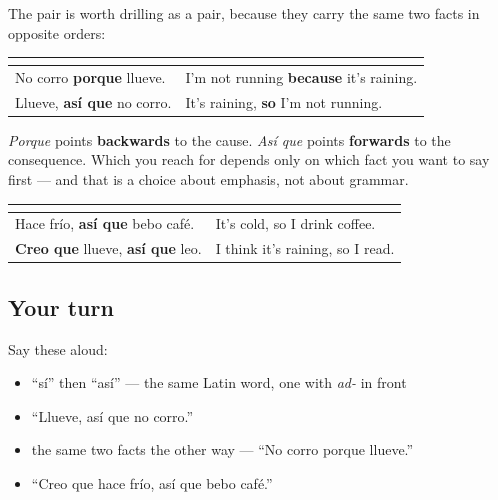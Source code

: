 \begin{grammarlens}[title={Grammar Lens: the two arrows}]
The pair is worth drilling as a pair, because they carry the same two facts in opposite orders:

\noindent
\begin{tabularx}{\linewidth}{@{}>{\raggedright\arraybackslash}X>{\raggedright\arraybackslash}X@{}}
\toprule
\textbf{} & \textbf{} \\
\midrule
No corro \textbf{porque} llueve. & I'm not running \textbf{because} it's raining. \\
Llueve, \textbf{así que} no corro. & It's raining, \textbf{so} I'm not running. \\
\bottomrule
\end{tabularx}

\emph{Porque} points \textbf{backwards} to the cause. \emph{Así que} points \textbf{forwards} to the consequence. Which you reach for depends only on which fact you want to say first — and that is a choice about emphasis, not about grammar.

\noindent
\begin{tabularx}{\linewidth}{@{}>{\raggedright\arraybackslash}X>{\raggedright\arraybackslash}X@{}}
\toprule
\textbf{} & \textbf{} \\
\midrule
Hace frío, \textbf{así que} bebo café. & It's cold, so I drink coffee. \\
\textbf{Creo que} llueve, \textbf{así que} leo. & I think it's raining, so I read. \\
\bottomrule
\end{tabularx}
\end{grammarlens}

\subsection*{Your turn}
Say these aloud:

\begin{itemize}
\raggedright
  \item \textquotedblleft{}sí\textquotedblright{} then \textquotedblleft{}así\textquotedblright{} — the same Latin word, one with \emph{ad-} in front
  \item \textquotedblleft{}Llueve, así que no corro.\textquotedblright{}
  \item the same two facts the other way — \textquotedblleft{}No corro porque llueve.\textquotedblright{}
  \item \textquotedblleft{}Creo que hace frío, así que bebo café.\textquotedblright{}
\end{itemize}

